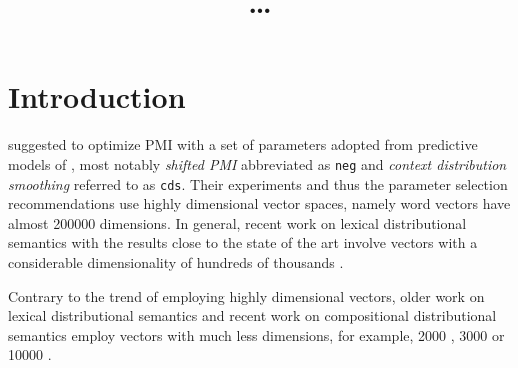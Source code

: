 \documentclass[11pt,letterpaper]{article}
\title{\ldots}
\date{}
\begin{document}
\def\emnlp/{\textit{KS2013}}
\def\PhraseRel/{PhraseRel}

\def\PMI/{$1 \operatorname{PMI}$}
\def\SPMI/{$1 \operatorname{SPMI}$}
\def\CPMI/{$1 \operatorname{CPMI}$}
\def\SCPMI/{$1 \operatorname{SCPMI}$}

\def\NPMI/{$n \operatorname{PMI}$}
\def\NSPMI/{$n \operatorname{SPMI}$}
\def\NCPMI/{$n \operatorname{CPMI}$}
\def\NSCPMI/{$n \operatorname{SCPMI}$}

\def\logNPMI/{$\log n\operatorname{PMI}$}
\def\logNSPMI/{$\log n\operatorname{SPMI}$}
\def\logNCPMI/{$\log n \operatorname{CPMI}$}
\def\logNSCPMI/{$\log n \operatorname{SCPMI}$}


\maketitle
\begin{abstract}

\end{abstract}

\section{Introduction}
\label{sec:introduction}

 suggested to optimize PMI with a  set of parameters adopted from predictive models of , most notably \emph{shifted PMI} abbreviated as \texttt{neg} and \emph{context distribution smoothing} referred to as \texttt{cds}. Their experiments and thus the parameter selection recommendations use highly dimensional vector spaces, namely word vectors have almost 200000 dimensions. In general, recent work on lexical distributional semantics with the results close to the state of the art involve vectors with a considerable dimensionality of hundreds of thousands \cite{baroni-dinu-kruszewski:2014:P14-1,kiela-clark:2014:CVSC}.

Contrary to the trend of employing highly dimensional vectors, older work on lexical distributional semantics and recent work on compositional distributional semantics employ vectors with much less dimensions, for example, 2000 \cite{Grefenstette:2011:ESC:2145432.2145580,kartsadrqpl2014,milajevs-EtAl:2014:EMNLP2014}, 3000 \cite{Dinu:2010:MDS:1870658.1870771,milajevs-purver:2014:CVSC} or 10000 \cite{polajnar-clark:2014:EACL,Baroni2010nouns}.
\end{document}
